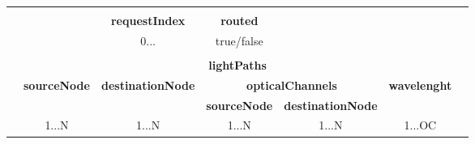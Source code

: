 \begin{table}[H]
		\centering
\begin{tabular}{|lclccccl|}
	\hline
	& \multicolumn{1}{l}{}        &                             & \multicolumn{1}{l}{}                                           & \multicolumn{1}{l}{}                     & \multicolumn{1}{l}{}                          & \multicolumn{1}{l}{}                                      &  \\ \cline{4-5}
	&                             & \multicolumn{1}{c|}{}       & \multicolumn{1}{c|}{\textbf{requestIndex}}                     & \multicolumn{1}{c|}{\textbf{routed}}     &                                               &                                                           &  \\ \cline{4-5}
	&                             & \multicolumn{1}{c|}{}       & \multicolumn{1}{c|}{0...}                                      & \multicolumn{1}{c|}{true/false}          &                                               &                                                           &  \\ \cline{4-5}
	& \multicolumn{1}{l}{}        &                             & \multicolumn{1}{l}{}                                           & \multicolumn{1}{l}{}                     & \multicolumn{1}{l}{}                          & \multicolumn{1}{l}{}                                      &  \\ \cline{2-7}
	\multicolumn{1}{|l|}{} & \multicolumn{6}{c|}{\textbf{lightPaths}}                                                                                                                                                                                                                                          &  \\ \cline{2-7}
	\multicolumn{1}{|l|}{} & \multicolumn{2}{c|}{\multirow{2}{*}{\textbf{sourceNode}}} & \multicolumn{1}{c|}{\multirow{2}{*}{\textbf{destinationNode}}} & \multicolumn{2}{c|}{\textbf{opticalChannels}}                                            & \multicolumn{1}{c|}{\multirow{2}{*}{\textbf{wavelenght}}} &  \\ \cline{5-6}
	\multicolumn{1}{|l|}{} & \multicolumn{2}{c|}{}                                     & \multicolumn{1}{c|}{}                                          & \multicolumn{1}{c|}{\textbf{sourceNode}} & \multicolumn{1}{c|}{\textbf{destinationNode}} & \multicolumn{1}{c|}{}                                     &  \\ \cline{2-7}
	\multicolumn{1}{|l|}{} & \multicolumn{2}{c|}{\multirow{2}{*}{1...N}}               & \multicolumn{1}{c|}{\multirow{2}{*}{1...N}}                    & \multicolumn{1}{c|}{1...N}               & \multicolumn{1}{c|}{1...N}                    & \multicolumn{1}{c|}{\multirow{2}{*}{1...OC}}              &  \\ \cline{5-6}

\end{tabular}
\end{table}
